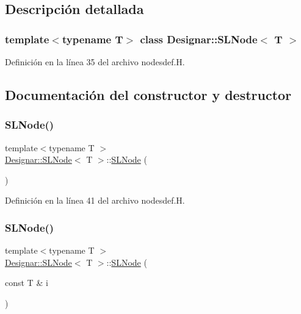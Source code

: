 \subsection{Descripción detallada}
\subsubsection*{template$<$typename T$>$\newline
class Designar\+::\+S\+L\+Node$<$ T $>$}



Definición en la línea 35 del archivo nodesdef.\+H.



\subsection{Documentación del constructor y destructor}
\mbox{\label{class_designar_1_1_s_l_node_ae069c6940aaa2a34a513852f1c3bf3d3}} 
\subsubsection{\texorpdfstring{S\+L\+Node()}{SLNode()}\hspace{0.1cm}{\footnotesize\ttfamily [1/4]}}
{\footnotesize\ttfamily template$<$typename T $>$ \\
\hyperlink{class_designar_1_1_s_l_node}{Designar\+::\+S\+L\+Node}$<$ T $>$\+::\hyperlink{class_designar_1_1_s_l_node}{S\+L\+Node} (\begin{DoxyParamCaption}{ }\end{DoxyParamCaption})\hspace{0.3cm}{\ttfamily [inline]}}



Definición en la línea 41 del archivo nodesdef.\+H.

\mbox{\label{class_designar_1_1_s_l_node_af9decf3a4e3809e98d0e9652295c9c1a}} 
\subsubsection{\texorpdfstring{S\+L\+Node()}{SLNode()}\hspace{0.1cm}{\footnotesize\ttfamily [2/4]}}
{\footnotesize\ttfamily template$<$typename T $>$ \\
\hyperlink{class_designar_1_1_s_l_node}{Designar\+::\+S\+L\+Node}$<$ T $>$\+::\hyperlink{class_designar_1_1_s_l_node}{S\+L\+Node} (\begin{DoxyParamCaption}\item[{const T \&}]{i }\end{DoxyParamCaption})\hspace{0.3cm}{\ttfamily [inline]}}



